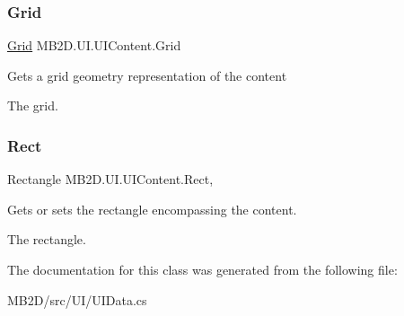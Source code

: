 \subsubsection{\texorpdfstring{Grid}{Grid}}
{\footnotesize\ttfamily \hyperlink{class_m_b2_d_1_1_geometry_1_1_grid}{Grid} M\+B2\+D.\+U\+I.\+U\+I\+Content.\+Grid\hspace{0.3cm}{\ttfamily [get]}}



Gets a grid geometry representation of the content 

The grid.\hypertarget{class_m_b2_d_1_1_u_i_1_1_u_i_content_af2f7f9e8f8944afab658b3a1f2f94cd0}{}\label{class_m_b2_d_1_1_u_i_1_1_u_i_content_af2f7f9e8f8944afab658b3a1f2f94cd0} 
\subsubsection{\texorpdfstring{Rect}{Rect}}
{\footnotesize\ttfamily Rectangle M\+B2\+D.\+U\+I.\+U\+I\+Content.\+Rect\hspace{0.3cm}{\ttfamily [get]}, {\ttfamily [set]}}



Gets or sets the rectangle encompassing the content. 

The rectangle.

The documentation for this class was generated from the following file\+:\begin{DoxyCompactItemize}
\item 
M\+B2\+D/src/\+U\+I/U\+I\+Data.\+cs\end{DoxyCompactItemize}
